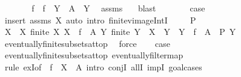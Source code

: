 \begin{isabellebody}
\ \ \ \ \isamarkupfalse%
\ \isamarkupfalse%
\ {\isachardoublequoteopen}f\ {\isacharbackquote}{\kern0pt}\ {\isacharparenleft}{\kern0pt}f\ {\isacharminus}{\kern0pt}{\isacharbackquote}{\kern0pt}\ Y\ {\isasyminter}\ A{\isacharparenright}{\kern0pt}\ {\isacharequal}{\kern0pt}\ Y{\isachardoublequoteclose}\ \isamarkupfalse%
\ assms\ {}\ \isamarkupfalse%
\ blast\isanewline
\ \ \ \ \isamarkupfalse%
\ \isamarkupfalse%
\ {\isacharquery}{\kern0pt}case\ \isacommand{{\isachardot}{\kern0pt}}\isamarkupfalse%
\isanewline
\ \ \isamarkupfalse%
\ {\isacharparenleft}{\kern0pt}insert\ assms\ X{\isacharparenleft}{\kern0pt}{}{\isacharcomma}{\kern0pt}{}{\isacharparenright}{\kern0pt}{\isacharcomma}{\kern0pt}\ auto\ intro{\isacharbang}{\kern0pt}{\isacharcolon}{\kern0pt}\ finite{\isacharunderscore}{\kern0pt}vimage{\isacharunderscore}{\kern0pt}IntI{\isacharparenright}{\kern0pt}\isanewline
{}\isamarkupfalse%
\isanewline
\ \ \isamarkupfalse%
\ {\isacharparenleft}{\kern0pt}{}\ P{\isacharparenright}{\kern0pt}\isanewline
\ \ \isamarkupfalse%
\ \isamarkupfalse%
\ X\ \ X{\isacharcolon}{\kern0pt}\ {\isachardoublequoteopen}finite\ X{\isachardoublequoteclose}\ {\isachardoublequoteopen}X\ {\isasymsubseteq}\ f\ {\isacharbackquote}{\kern0pt}\ A{\isachardoublequoteclose}\ {\isachardoublequoteopen}{\isasymAnd}Y{\isachardot}{\kern0pt}\ finite\ Y\ {\isasymLongrightarrow}\ X\ {\isasymsubseteq}\ Y\ {\isasymLongrightarrow}\ Y\ {\isasymsubseteq}\ f\ {\isacharbackquote}{\kern0pt}\ A\ {\isasymLongrightarrow}\ P\ Y{\isachardoublequoteclose}\isanewline
\ \ \ \ \isamarkupfalse%
\ eventually{\isacharunderscore}{\kern0pt}finite{\isacharunderscore}{\kern0pt}subsets{\isacharunderscore}{\kern0pt}at{\isacharunderscore}{\kern0pt}top\ \isamarkupfalse%
\ force\isanewline
\ \ \isamarkupfalse%
\ {\isacharquery}{\kern0pt}case\ \isamarkupfalse%
\ eventually{\isacharunderscore}{\kern0pt}finite{\isacharunderscore}{\kern0pt}subsets{\isacharunderscore}{\kern0pt}at{\isacharunderscore}{\kern0pt}top\ eventually{\isacharunderscore}{\kern0pt}filtermap\isanewline
\ \ \isamarkupfalse%
\ {\isacharparenleft}{\kern0pt}rule\ exI{\isacharbrackleft}{\kern0pt}of\ {\isacharunderscore}{\kern0pt}\ {\isachardoublequoteopen}f\ {\isacharminus}{\kern0pt}{\isacharbackquote}{\kern0pt}\ X\ {\isasyminter}\ A{\isachardoublequoteclose}{\isacharbrackright}{\kern0pt}{\isacharcomma}{\kern0pt}\ intro\ conjI\ allI\ impI{\isacharcomma}{\kern0pt}\ goal{\isacharunderscore}{\kern0pt}cases{\isacharparenright}{\kern0pt}\isanewline

\end{isabellebody}
